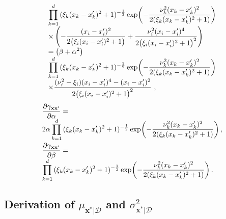 \documentclass[conference]{IEEEtran}
\begin{document}
\begin{equation*}
\begin{array}{l}
			\displaystyle\prod_{k=1}^{d}{(\xi_k(x_{k}-x^\prime_{k})^2+1)^{-\frac{1}{2}}}\exp\hspace{-0.5mm}\left(-\frac{\nu_k^2(x_{k}-x^\prime_{k})^2}{2(\xi_k(x_{k}-x^\prime_{k})^2+1)}\right)\\
			\displaystyle\times\left(-\dfrac{(x_{i}-x^\prime_{i})^2}{2\big(\xi_i(x_{i}-x^\prime_{i})^2+1\big)}+\dfrac{\nu_i^2(x_{i}-x^\prime_{i})^4}{2\big(\xi_i(x_{i}-x^\prime_{i})^2+1\big)^2}\right) \\
			\displaystyle=\left(\beta+\alpha^2\right)\\
			\displaystyle\prod_{k=1}^{d}{(\xi_k(x_{k}-x^\prime_{k})^2+1)^{-\frac{1}{2}}}\exp\hspace{-0.5mm}\left(-\frac{\nu_k^2(x_{k}-x^\prime_{k})^2}{2(\xi_k(x_{k}-x^\prime_{k})^2+1)}\right)\\
			\displaystyle\times\dfrac{(\nu_i^2-\xi_i)(x_{i}-x^\prime_{i})^4-(x_{i}-x^\prime_{i})^2}{2\big(\xi_i(x_{i}-x^\prime_{i})^2+1\big)^2}\ ,
		\end{array}
	\end{equation*} 
		\begin{equation*}
		\begin{array}{l}
		\displaystyle\dfrac{\partial\gamma_{\mathbf{x}\mathbf{x}^\prime}}{\partial \alpha}=\\
		\displaystyle2\alpha\prod_{k=1}^{d}{(\xi_k(x_{k}-x^\prime_{k})^2+1)^{-\frac{1}{2}}}\exp\hspace{-0.5mm}\left(-\frac{\nu_k^2(x_{k}-x^\prime_{k})^2}{2(\xi_k(x_{k}-x^\prime_{k})^2+1)}\right),\vspace{1mm}\\
		\displaystyle\dfrac{\partial\gamma_{\mathbf{x}\mathbf{x}^\prime}}{\partial \beta}=\\
		\displaystyle\prod_{k=1}^{d}{(\xi_k(x_{k}-x^\prime_{k})^2+1)^{-\frac{1}{2}}}\exp\hspace{-0.5mm}\left(-\frac{\nu_k^2(x_{k}-x^\prime_{k})^2}{2(\xi_k(x_{k}-x^\prime_{k})^2+1)}\right).
		\end{array}
		\end{equation*}
% 
% 
%		 
\subsection{Derivation of $\mu_{\mathbf{x}^*|\mathcal{D}}$ and $\sigma^2_{\mathbf{x}^*|\mathcal{D}}$} 
	\label{q(y^*)}
\end{document}

